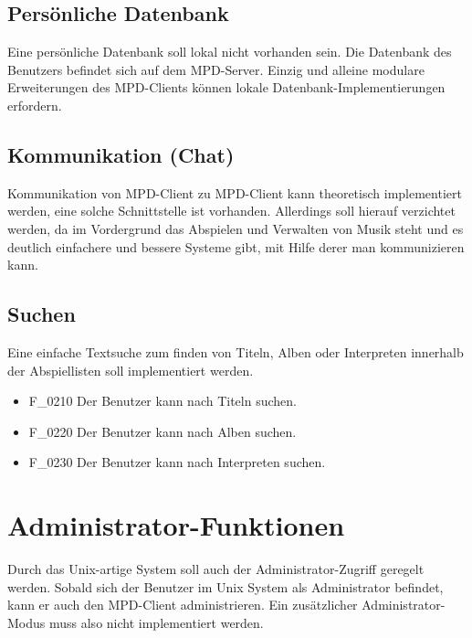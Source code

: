 \subsection{Persönliche Datenbank}
Eine persönliche Datenbank soll lokal nicht vorhanden sein. Die Datenbank des Benutzers befindet sich auf dem MPD-Server. Einzig und alleine modulare Erweiterungen des MPD-Clients können lokale Datenbank-Implementierungen erfordern.
\subsection{Kommunikation (Chat)}
Kommunikation von MPD-Client zu MPD-Client kann theoretisch implementiert werden, eine solche Schnittstelle ist vorhanden. Allerdings soll hierauf verzichtet werden, da im Vordergrund das Abspielen und Verwalten von Musik steht und es deutlich einfachere und bessere Systeme gibt, mit Hilfe derer man kommunizieren kann.
\subsection{Suchen}
Eine einfache Textsuche zum finden von Titeln, Alben oder Interpreten innerhalb der Abspiellisten soll implementiert werden.
\begin{itemize}
	\item F\_0210 Der Benutzer kann nach Titeln suchen.
	\item F\_0220 Der Benutzer kann nach Alben suchen.
	\item F\_0230 Der Benutzer kann nach Interpreten suchen.
\end{itemize}
\section{Administrator-Funktionen}
Durch das Unix-artige System soll auch der Administrator-Zugriff geregelt werden. Sobald sich der Benutzer im Unix System als Administrator befindet, kann er auch den MPD-Client administrieren. Ein zusätzlicher Administrator-Modus muss also nicht implementiert werden.